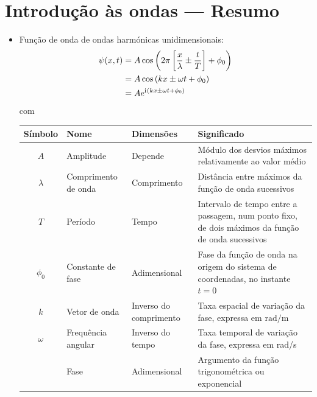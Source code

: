 \newpage
\section{Introdução às ondas --- Resumo}
\begin{itemize}
\item
    Função de onda de ondas harmónicas unidimensionais:
    \begin{align*}
      \psi(x,t)&=A\cos\left(2\pi\left[\frac{x}{\lambda}\pm\frac{t}{T}\right]+
                \phi_0\right)\\
               &=A\cos\left(kx\pm\omega t+\phi_0\right)\\
               &=Ae^{\text{i}\mkern1mu (kx\pm\omega t+\phi_0)}
    \end{align*}
    com
    \begin{center}
    \begin{tabular}{c|l|l|l}
    \hline
    \rule{0mm}{3ex} Símbolo&Nome&Dimensões&Significado\\[0.5ex]
    \hline
    $A$ & Amplitude & Depende&
        \parbox[t]{0.3\textwidth}{\rule{0mm}{4ex}Módulo dos desvios máxi\-mos
        relativamente ao valor médio}\\
    $\lambda$ & Comprimento de onda & Comprimento &
        \parbox[t]{0.3\textwidth}{\rule{0mm}{4ex}Distância entre máximos da função
        de onda sucessivos} \\
    $T$ & Período & Tempo &
        \parbox[t]{0.3\textwidth}{\rule{0mm}{4ex}Intervalo de tempo entre a
        passagem, num ponto fixo, de dois máximos da função de onda sucessivos}
    \\
    $\phi_0$&Constante de fase&Adimensional&
        \parbox[t]{0.3\textwidth}{\rule{0mm}{4ex}Fase da função de onda na
        origem do sistema de coordenadas, no instante $t=0$}\\
    $k$&Vetor de onda&
        \parbox[t]{0.2\textwidth}{Inverso do comprimento}&
        \parbox[t]{0.3\textwidth}{\rule{0mm}{4ex}Taxa espacial de variação da fase,
        expressa em $\text{rad}/\text{m}$}\\
    $\omega$&Frequência angular &
        \parbox[t]{0.2\textwidth}{Inverso do tempo}&
        \parbox[t]{0.3\textwidth}{\rule{0mm}{4ex}Taxa temporal de variação da
        fase, expressa em rad/s}
        \\
        &Fase& Adimensional &\parbox[t]{0.3\textwidth}{\rule{0mm}{4ex}%
          Argumento da função trigonométrica ou exponencial}
    \\[3ex]
    \hline
    \end{tabular}

\end{center}
\end{itemize}
